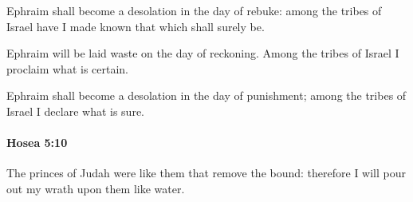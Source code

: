 			\begin{versebox}
					\item[BHS] 
					\item[LXX] 
					\item[ASV] Ephraim shall become a desolation in the day of rebuke: among the tribes of Israel have I made known that which shall surely be.
					\item[NIV] Ephraim will be laid waste on the day of reckoning. Among the tribes of Israel I proclaim what is certain.
					\item[NRSV] Ephraim shall become a desolation in the day of punishment; among the tribes of Israel I declare what is sure.
			\end{versebox}

		\paragraph{Hosea 5:10} %
			\label{HOSEA-5-10}

			The princes of Judah were like them that remove the bound: therefore I will pour out my wrath upon them like water.

